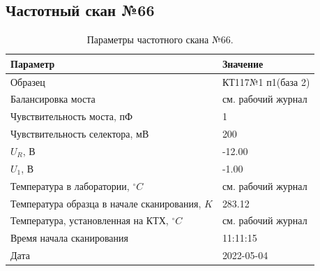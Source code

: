 \subsection{Частотный скан №66}
\begin{table}[!ht]
    \centering
    \caption{Параметры частотного скана №66.}
    \begin{tabular}{|l|l|}
        \hline
        Параметр                                       & Значение                  \\ \hline
        Образец                                        & КТ117№1 п1(база 2)        \\ \hline
        Балансировка моста                             & см. рабочий журнал        \\ \hline
        Чувствительность моста, пФ                     & 1                         \\ \hline
        Чувствительность селектора, мВ                 & 200                       \\ \hline
        $U_R$, В                                       & -12.00                    \\ \hline
        $U_1$, В                                       & -1.00                     \\ \hline
        Температура в лаборатории, $^\circ C$          & см. рабочий журнал        \\ \hline
        Температура образца в начале сканирования, $K$ & 283.12                    \\ \hline
        Температура, установленная на КТХ, $^\circ C$  & см. рабочий журнал        \\ \hline
        Время начала сканирования                      & 11:11:15                  \\ \hline
        Дата                                           & 2022-05-04                \\ \hline
    \end{tabular}
    \label{table:frequency_scan_66}
\end{table}


